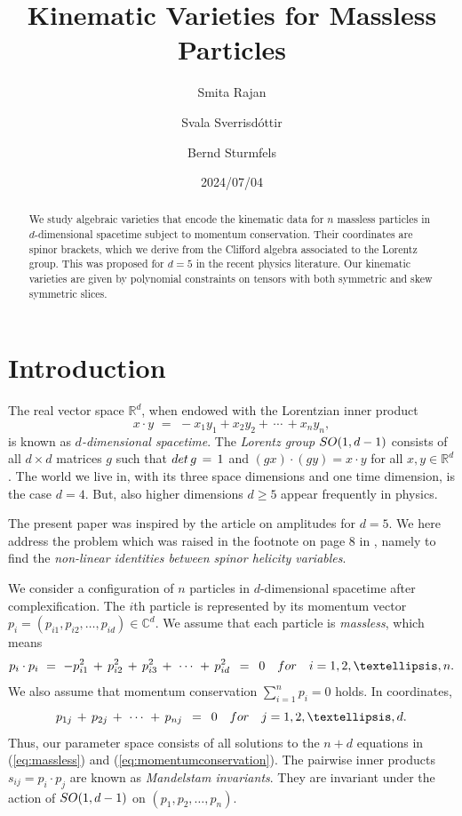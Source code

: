\documentclass[english]{ourlematema}
\title{Kinematic Varieties for Massless Particles}
\author{Smita Rajan}
\author{Svala Sverrisd\'ottir}
\author{Bernd Sturmfels}
\date{2024/07/04}
\numberwithin{theorem}{section}
\theoremstyle{definition}
\newcommand{\RR}{\mathbb{R}}
\newcommand{\CC}{\mathbb{C}}
\begin{document}
\maketitle
\begin{abstract}
\noindent 
We study algebraic varieties that encode the kinematic data for
$n$ massless particles in $d$-dimensional spacetime
subject to momentum conservation. 
Their coordinates are  spinor brackets,
which we derive from the Clifford algebra 
associated to the Lorentz group. 
This was proposed for $d=5$ in the recent physics literature.
Our kinematic varieties are given by polynomial constraints on tensors
with both symmetric and skew symmetric slices.

\end{abstract}

\section{Introduction}
The real vector space $\RR^d$, when endowed with the Lorentzian
   inner product
$$  x \cdot y \,\, = \,\,- x_1 y_1 + x_2 y_2 + \,\cdots\, + x_n y_n , $$
is known as {\em $d$-dimensional spacetime}.
The {\em Lorentz group} ${\rm SO}(1,d-1)$ consists of all
 $d \times d$ matrices $g$ such that 
${\rm det}\,g\, = \,1$ and $(gx) \cdot (gy) = x \cdot y$ for all
$x,y \in \RR^d$.
The world we live in, with its three space dimensions
and one time dimension, is the case $d=4$.
But, also higher dimensions $d \geq 5$ appear frequently
in physics. 

The present paper was
inspired by  the  article
\cite{PRRVZ}
on amplitudes for $d=5$.
We here address the problem which was
raised in the footnote on page 8 in \cite{PRRVZ},
namely to find the
 {\em non-linear identities between spinor helicity variables}.

We consider a configuration of $n$ particles 
in $d$-dimensional spacetime after complexification. The $i$th particle is represented by its
momentum vector 
$ p_i =(p_{i1},p_{i2},\ldots,p_{id}) \in \CC^d$.
We assume that each particle  is {\em massless}, which means
\begin{equation}
\label{eq:massless} 
p_i \cdot p_i \,\, = \,\,
-p_{i1}^2 \,+\, p_{i2}^2 \,+\, p_{i3}^2 \,+\, \,\cdots\,\, +\, p_{id}^2 \,\,\,=\,\,\, 0 
\quad {\rm for} \quad i=1,2,\ldots,n.
\end{equation}
We also assume that momentum conservation 
$\sum_{i=1}^n p_i = 0$ holds. In coordinates,
\begin{equation}
\label{eq:momentumconservation}
p_{1j} \,+\, p_{2j} \,+\, \,\cdots \,\, + \,p_{nj} \,\,\, = \,\,\, 0
\quad {\rm for} \quad j=1,2,\ldots,d.
\end{equation}
Thus, our parameter space consists of all
solutions to the $n+d$ equations in (\ref{eq:massless}) and
(\ref{eq:momentumconservation}). The pairwise inner products
$s_{ij} = p_i \cdot p_j$ are known as {\em Mandelstam invariants}.
They are invariant under the action of ${\rm SO}(1,d-1)$
on $(p_1,p_2,\ldots,p_n)$.
\end{document}
